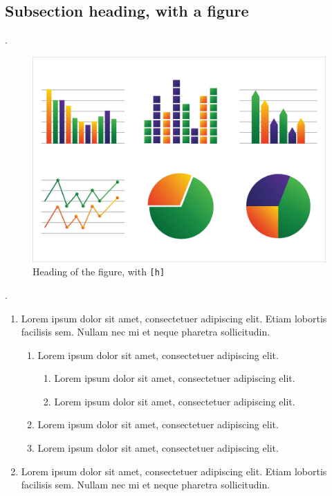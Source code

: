 \documentclass[12pt,green,palatino]{../bppaper}
\begin{document}
\subsection{Subsection heading, with a figure}

\blindtext \cite{knuth:1984}.
\begin{figure}[h!]
\centering
\caption{Heading of the figure, with \texttt{[h]}}
\includegraphics[width=0.8\linewidth]{graph}
\end{figure}
\cite{latex:companion}. \blindtext 

\blindtext 
\begin{enumerate}
    \item Lorem ipsum dolor sit amet, consectetuer adipiscing elit. Etiam lobortis facilisis sem. Nullam nec mi et neque pharetra sollicitudin. 
    \begin{enumerate}
        \item Lorem ipsum dolor sit amet, consectetuer adipiscing elit.
        \begin{enumerate}
            \item Lorem ipsum dolor sit amet, consectetuer adipiscing elit. 
            \item Lorem ipsum dolor sit amet, consectetuer adipiscing elit.
        \end{enumerate}
        \item Lorem ipsum dolor sit amet, consectetuer adipiscing elit. 
        \item Lorem ipsum dolor sit amet, consectetuer adipiscing elit. 
    \end{enumerate}
    \item Lorem ipsum dolor sit amet, consectetuer adipiscing elit. Etiam lobortis facilisis sem. Nullam nec mi et neque pharetra sollicitudin. 
\end{enumerate}
\end{document}
